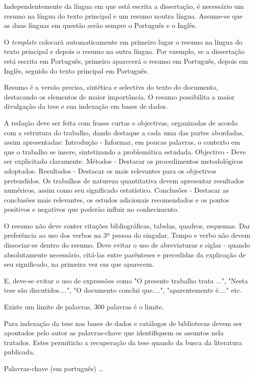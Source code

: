 \abstractPT  %

Independentemente da língua em que está escrita a dissertação, é necessário um resumo na língua do texto principal e um resumo noutra língua.  Assume-se que as duas línguas em questão serão sempre o Português e o Inglês.

O \emph{template} colocará automaticamente em primeiro lugar o resumo na língua do texto principal e depois o resumo na outra língua.  Por exemplo, se a dissertação está escrita em Português, primeiro aparecerá o resumo em Português, depois em Inglês, seguido do texto principal em Português. 

Resumo é a versão precisa, sintética e selectiva do texto do documento, destacando os elementos de maior importância. O resumo possibilita a maior divulgação da tese e sua indexação em bases de dados.

A redação deve ser feita com frases curtas e objectivas, organizadas de acordo com a estrutura do trabalho, dando destaque a cada uma das partes abordadas, assim apresentadas: Introdução - Informar, em poucas palavras, o contexto em que o trabalho se insere, sintetizando a problemática estudada. Objectivo - Deve ser explicitado claramente. Métodos - Destacar os procedimentos metodológicos adoptados. Resultados - Destacar os mais relevantes para os objectivos pretendidos. Os trabalhos de natureza quantitativa devem apresentar resultados numéricos, assim como seu significado estatístico. Conclusões - Destacar as conclusões mais relevantes, os estudos adicionais recomendados e os pontos positivos e negativos que poderão influir no conhecimento. 

O resumo não deve conter citações bibliográficas, tabelas, quadros, esquemas. Dar preferência ao uso dos verbos na 3ª pessoa do singular. Tempo e verbo não devem dissociar-se dentro do resumo. Deve evitar o uso de abreviaturas e siglas - quando absolutamente necessário, citá-las entre parênteses e precedidas da explicação de seu significado, na primeira vez em que aparecem. 

E, deve-se evitar o uso de expressões como "O presente trabalho trata ...", "Nesta tese são discutidos....", "O documento conclui que....", "aparentemente é...." etc. 

Existe um limite de palavras, 300 palavras é o limite.

Para indexação da tese nas bases de dados e catálogos de bibliotecas devem ser apontados pelo autor as palavras-chave que identifiquem os assuntos nela tratados. Estes permitirão a recuperação da tese quando da busca da literatura publicada. 

\begin{keywords}
Palavras-chave (em português) \ldots
\end{keywords}
